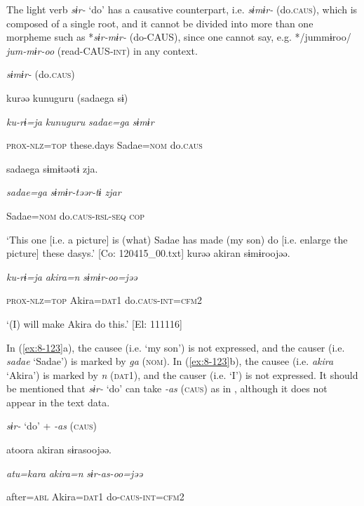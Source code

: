   The light verb \textit{sɨr-} ‘do’ has a causative counterpart, i.e. \textit{sɨmɨr-} (do.\textsc{caus}), which is composed of a single root, and it cannot be divided into more than one morpheme such as *\textit{sɨr-mɨr-} (do-CAUS), since one cannot say, e.g. */jummɨroo/ \textit{jum-mɨr-oo} (read-CAUS-\textsc{int}) in any context.

\ea\label{ex:8-123}
  \textit{sɨmɨr-} (do.\textsc{caus})

\ea {\TM}
\glll  kurəə  kunuguru  (sadaega  sɨ)

      \textit{ku-rɨ=ja}  \textit{kunuguru}  \textit{sadae=ga}  \textit{sɨmɨr}

      \textsc{prox}-\textsc{nlz}=\textsc{top}  these.days  Sadae=\textsc{nom}  do.\textsc{caus}

      sadaega  sɨmɨtəətɨ  zja.

      \textit{sadae=ga}  \textit{sɨmɨr{}-təər-tɨ  zjar}

      Sadae=\textsc{nom}  do.\textsc{caus}-\textsc{rsl}-\textsc{seq}  \textsc{cop}

\glt ‘This one [i.e. a picture] is (what) Sadae has made (my son) do [i.e. enlarge the picture] these dasys.’ [Co: 120415\_00.txt]
\ex {\TM}
\glll  kurəə  akiran  sɨmɨroojəə.

      \textit{ku-rɨ=ja}  \textit{akira=n}  \textit{sɨmɨr{}-oo=jəə}

      \textsc{prox}-\textsc{nlz}=\textsc{top}  Akira=\textsc{dat}1  do.\textsc{caus}-\textsc{int}=\textsc{cfm}2

\glt ‘(I) will make Akira do this.’ [El: 111116]

In (\ref{ex:8-123}a), the causee (i.e. ‘my son’) is not expressed, and the causer (i.e. \textit{sadae} ‘Sadae’) is marked by \textit{ga} (\textsc{nom}). In (\ref{ex:8-123}b), the causee (i.e. \textit{akira} ‘Akira’) is marked by \textit{n} (\textsc{dat}1), and the causer (i.e. ‘I’) is not expressed. It should be mentioned that \textit{sɨr-} ‘do’ can take \textit{-as} (\textsc{caus}) as in , although it does not appear in the text data.

\ea\label{ex:8-124}
  \textit{sɨr-} ‘do’ + \textit{{}-as} (\textsc{caus})

  {\TM}
\glll  atoora  akiran  sɨrasoojəə.

    \textit{atu=kara}  \textit{akira=n}  \textit{sɨr-as{}-oo=jəə}

    after=\textsc{abl}  Akira=\textsc{dat}1  do-\textsc{caus}-\textsc{int}=\textsc{cfm}2

